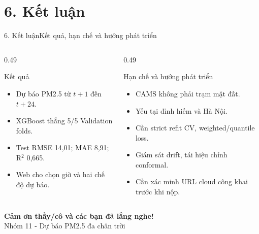 \documentclass[aspectratio=169]{beamer}
\begin{document}
\section{6. Kết luận}
\begin{frame}{6. Kết luận}{Kết quả, hạn chế và hướng phát triển}
\begin{columns}[T]
\begin{column}{0.49\textwidth}
\begin{exampleblock}{Kết quả}
\begin{itemize}
\item Dự báo PM2.5 từ $t+1$ đến $t+24$.
\item XGBoost thắng 5/5 Validation folds.
\item Test RMSE 14,01; MAE 8,91; R$^2$ 0,665.
\item Web cho chọn giờ và hai chế độ dự báo.
\end{itemize}
\end{exampleblock}
\end{column}
\begin{column}{0.49\textwidth}
\begin{alertblock}{Hạn chế và hướng phát triển}
\begin{itemize}
\item CAMS không phải trạm mặt đất.
\item Yếu tại đỉnh hiếm và Hà Nội.
\item Cần strict refit CV, weighted/quantile loss.
\item Giám sát drift, tái hiệu chỉnh conformal.
\item Cần xác minh URL cloud công khai trước khi nộp.
\end{itemize}
\end{alertblock}
\end{column}
\end{columns}
\end{frame}

\begin{frame}
\centering
\Huge\textbf{Cảm ơn thầy/cô và các bạn đã lắng nghe!}\\[0.7cm]
\Large Nhóm 11 - Dự báo PM2.5 đa chân trời
\end{frame}
\end{document}
